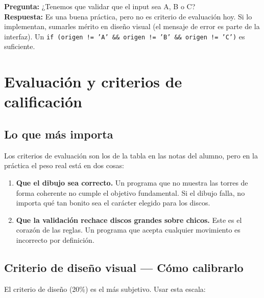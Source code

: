 \documentclass[12pt, oneside]{article}
\begin{document}
\begin{notaprofesor}
  \textbf{Pregunta:} ¿Tenemos que validar que el input sea A, B o C?\\
  \textbf{Respuesta:} Es una buena práctica, pero no es criterio de
  evaluación hoy.  Si lo implementan, sumarles mérito en diseño visual
  (el mensaje de error es parte de la interfaz).  Un \texttt{if (origen
  != 'A' \&\& origen != 'B' \&\& origen != 'C')} es suficiente.
\end{notaprofesor}

\section{Evaluación y criterios de calificación}

\subsection{Lo que más importa}

Los criterios de evaluación son los de la tabla en las notas del alumno,
pero en la práctica el peso real está en dos cosas:

\begin{enumerate}
  \item \textbf{Que el dibujo sea correcto.} Un programa que no muestra
        las torres de forma coherente no cumple el objetivo fundamental.
        Si el dibujo falla, no importa qué tan bonito sea el carácter
        elegido para los discos.

  \item \textbf{Que la validación rechace discos grandes sobre chicos.}
        Este es el corazón de las reglas. Un programa que acepta cualquier
        movimiento es incorrecto por definición.
\end{enumerate}

\subsection{Criterio de diseño visual — Cómo calibrarlo}

El criterio de diseño (20\%) es el más subjetivo. Usar esta escala:
\end{document}
